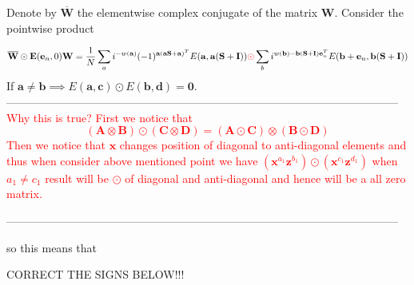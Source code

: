 \documentclass{article}
\begin{document}
	
	Denote by $\overline{\mathbf{W}}$ the elementwise complex conjugate of the matrix $\mathbf{W}$. Consider the pointwise product
	
	\begin{align*}
		\overline{\mathbf{W}} \odot \mathbf{E}(\mathbf{e}_n, 0)\mathbf{W} = \frac{1}{N} \sum_a i^{-w(\mathbf{a})}(-1)^{\mathbf{a}(\mathbf{a}\mathbf{S} + \mathbf{a})^T} E(\mathbf{a}, \mathbf{a}(\mathbf{S} + \mathbf{I})) \textcolor{red}{\odot} \sum_b i^{w(\mathbf{b}) - \mathbf{b}(\mathbf{S} + \mathbf{I})\mathbf{e}_n^T} E(\mathbf{b} + \mathbf{e}_n, \mathbf{b}(\mathbf{S} + \mathbf{I}))
	\end{align*}
	If $\mathbf{a} \neq \mathbf{b} \implies E(\mathbf{a}, \mathbf{c}) \odot E(\mathbf{b}, \mathbf{d}) = \mathbf{0}$. \\
	
	
	--------------------------------------------------------------------------------------------------------- \\
	\textcolor{red}{Why this is true? First we notice that 
\begin{equation*}
	\left(\mathbf{A} \otimes \mathbf{B} \right) \odot \left(\mathbf{C} \otimes  \mathbf{D} \right) = \left(\mathbf{A} \odot \mathbf{C} \right) \otimes \left(\mathbf{B} \odot \mathbf{D}\right)
\end{equation*}	
Then we notice that $\mathbf{x}$ changes position of diagonal to anti-diagonal elements and thus when consider above mentioned point we have $\left(\mathbf{x}^{a_1} \mathbf{z}^{b_1}  \right) \odot \left(\mathbf{x}^{c_1} \mathbf{z}^{d_1}  \right)$ when $a_1 \neq c_1$ result will be $\odot$ of diagonal and anti-diagonal and hence will be a all zero matrix.
}
	
	---------------------------------------------------------------------------------------------------------
	
	
	 so this means that
	
	CORRECT THE SIGNS BELOW!!!
	
\end{document}
